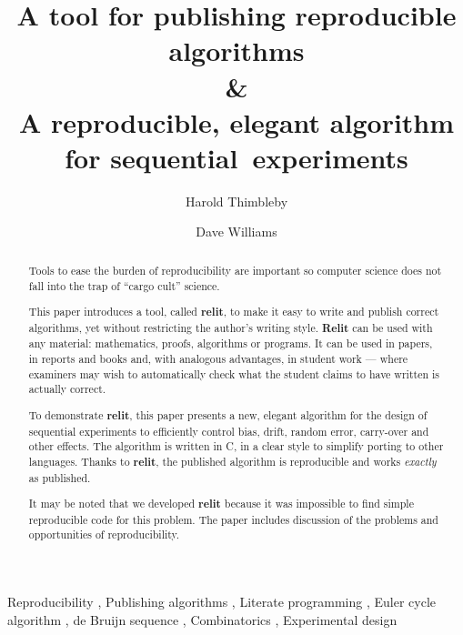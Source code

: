 \documentclass[preprint,times]{elsarticle}
\def\name#1{\textbf{#1}}
\begin{document}
\title{A tool for publishing reproducible algorithms\\
\&\\
A reproducible, elegant algorithm for sequential~experiments
}

\author[swansea]{Harold Thimbleby}

\author[swansea]{Dave Williams}

\address[swansea]{Swansea University, Wales, SA2 8PP}

\begin{abstract}
Tools to ease the burden of reproducibility are important so computer science does not fall into the trap of ``cargo cult'' science. 

This paper introduces a  tool, called \name{relit}, to make it easy to write and publish correct algorithms, yet without restricting the author's writing style. \name{Relit} can be used with any material: mathematics, proofs, algorithms or programs. It can be used in papers, in reports and books and, with analogous advantages, in student work --- where examiners may wish to automatically check what the student claims to have written is actually correct.

To demonstrate \name{relit}, this paper presents a new, elegant algorithm 
for the design of sequential experiments to efficiently control bias, drift, random error, carry-over and other effects. The algorithm is written in C, in a clear style to simplify porting to other languages. Thanks to \name{relit}, the published algorithm is reproducible and works \emph{exactly\/} as published. 

It may be noted that we developed \name{relit} because it was impossible to find simple reproducible code for this problem. The paper includes discussion of the problems and opportunities of reproducibility.
\end{abstract}

\begin{keyword}
Reproducibility \sep
Publishing algorithms \sep
Literate programming \sep
Euler cycle algorithm \sep
de Bruijn sequence \sep
Combinatorics \sep
Experimental design
\end{keyword}
\end{document}
